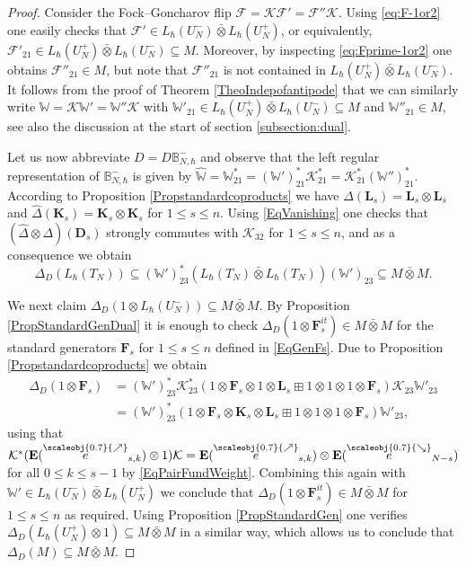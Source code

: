 \documentclass[11pt, reqno]{amsart}
\theoremstyle{definition}
\numberwithin{equation}{section}
\def\Fc{\mathcal F'}
\newcommand{\Kc}{\mathcal{K}}
\newcommand{\Fct}{\mathcal{F}}
\newcommand{\Fctt}{\mathcal{F}''}
\newcommand{\Nilp}{U}
\newcommand{\Tor}{T}
\newcommand{\nears}{\scaleobj{0.7}{\nearrow}}
\newcommand{\sears}{\scaleobj{0.7}{\searrow}}
\newcommand{\nee}{\overset{\nears}{e}}
\newcommand{\seee}{\overset{\sears}{e}}
\newcommand{\Eb}{\mathbf{E}}
\newcommand{\Fb}{\mathbf{F}}
\newcommand{\Kb}{\mathbf{K}}
\newcommand{\Lb}{\mathbf{L}}
\newcommand{\Db}{\mathbf{D}}
\newcommand{\Wbb}{\mathbb{W}}
\newcommand{\Bbbb}{\mathbb{B}}
\begin{document}
\begin{proof}
Consider the Fock--Goncharov flip $ \Fct = \Kc \Fc = \Fctt \Kc $. 
Using \eqref{eq:F-1or2} one easily checks that   
$ \Fc \in L_\hbar(\Nilp_N^-) \bar{\otimes} L_\hbar(\Nilp_N^+) $, or equivalently, $ \Fc_{21} \in L_\hbar(\Nilp_N^+) \bar{\otimes} L_\hbar(\Nilp_N^-) \subseteq M $. 
Moreover, by inspecting \eqref{eq:Fprime-1or2} one obtains $ \Fctt_{21} \in M $, but note that $ \Fctt_{21} $ is not contained in $ L_\hbar(\Nilp_N^+) \bar{\otimes} L_\hbar(\Nilp_N^-) $. 
It follows from the proof of Theorem \ref{TheoIndepofantipode} that we can similarly write $\Wbb = \Kc \Wbb' = \Wbb'' \Kc $ with $ \Wbb'_{21} \in L_\hbar(\Nilp_N^+) \bar{\otimes} L_\hbar(\Nilp_N^-) \subseteq M $ and $ \Wbb''_{21} \in M $, see also the discussion at the start of section \ref{subsection:dual}. 

Let us now abbreviate $ D = D \Bbbb_{N, \hbar}^- $ and observe that the left regular representation of $ \Bbbb_{N, \hbar}^- $ is given by $ \widehat{\Wbb} = \Wbb^*_{21} = (\Wbb')^*_{21} \Kc_{21}^* = \Kc_{21}^* (\Wbb'')^*_{21} $. 
According to Proposition \ref{Propstandardcoproducts} we have $ \Delta(\Lb_s) = \Lb_s \otimes \Lb_s $ and $ \hat{\Delta}(\Kb_s) = \Kb_s \otimes \Kb_s $ for $ 1 \leq s \leq n $. 
Using \eqref{EqVanishing} one checks that $ (\hat{\Delta} \otimes \Delta)(\Db_s) $ strongly commutes with $ \Kc_{32} $ for $ 1 \leq s \leq n $, and as a consequence we obtain 
\[
\Delta_D(L_\hbar(\Tor_N)) \subseteq (\Wbb')^*_{23} (L_\hbar(\Tor_N) \bar{\otimes} L_\hbar(\Tor_N)) (\Wbb')_{23} \subseteq M \bar{\otimes} M.
\]

We next claim $ \Delta_D(1 \otimes L_\hbar(\Nilp_N^-)) \subseteq M \bar{\otimes} M $. By Proposition \ref{PropStandardGenDual} it is enough to check $ \Delta_D(1 \otimes \Fb_s^{it}) \in M \bar{\otimes} M $ for the standard generators $ \Fb_s $ for $ 1 \leq s \leq n $ defined in \eqref{EqGenFs}. Due to Proposition \ref{Propstandardcoproducts} we obtain 
\begin{align*}
\Delta_D(1 \otimes \Fb_s) &= (\Wbb')^*_{23} \Kc^*_{23} (1 \otimes \Fb_s \otimes 1 \otimes \Lb_s \boxplus 1 \otimes 1 \otimes 1 \otimes \Fb_s) \Kc_{23} \Wbb'_{23} \\
&= (\Wbb')^*_{23} (1 \otimes \Fb_s \otimes \Kb_s \otimes \Lb_s \boxplus 1 \otimes 1 \otimes 1 \otimes \Fb_s)\Wbb'_{23},   
\end{align*}
using that $ \Kc^*( \Eb(\nee_{s, k}) \otimes 1)\Kc = \Eb(\nee_{s, k}) \otimes \Eb(\seee_{N - s}) $ for all $ 0 \leq k \leq s - 1 $ by \eqref{EqPairFundWeight}. Combining this again with $ \Wbb' \in L_\hbar(\Nilp_N^-) \bar{\otimes} L_\hbar(\Nilp_N^+) $ we conclude that $ \Delta_D(1 \otimes \Fb_s^{it}) \in M \bar{\otimes} M $ for $ 1 \leq s \leq n $ as required. Using Proposition \ref{PropStandardGen} one verifies $ \Delta_D(L_\hbar(\Nilp_N^+) \otimes 1) \subseteq M \bar{\otimes} M $ in a similar way, which allows us to conclude that $ \Delta_D(M) \subseteq M \bar{\otimes} M $.


\end{proof}
\end{document}
